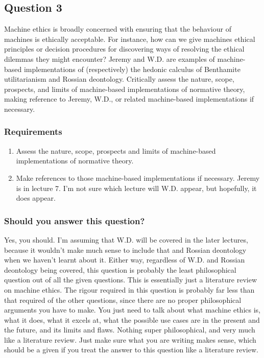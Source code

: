 \documentclass[11pt]{article}
\begin{document}
 \newpage
\subsection{Question 3}
\label{sec:org2453594}
Machine ethics is broadly concerned with ensuring that the behaviour of machines is ethically acceptable. For instance, how can we give machines ethical principles or decision procedures for discovering ways of resolving the ethical dilemmas they might encounter? Jeremy and W.D. are examples of machine-based implementations of (respectively) the hedonic calculus of Benthamite utilitarianism and Rossian deontology. Critically assess the nature, scope, prospects, and limits of machine-based implementations of normative theory, making reference to Jeremy, W.D., or related machine-based implementations if necessary.
\subsubsection{Requirements}
\label{sec:org148bb67}
\begin{enumerate}
\item Assess the nature, scope, prospects and limits of machine-based implementations of normative theory.
\item Make references to those machine-based implementations if necessary. Jeremy is in lecture 7. I'm not sure which lecture will W.D. appear, but hopefully, it does appear.
\end{enumerate}
\subsubsection{Should you answer this question?}
\label{sec:orgf74e2ed}
Yes, you should. I'm assuming that W.D. will be covered in the later lectures, because it wouldn't make much sense to include that and Rossian deontology when we haven't learnt about it. Either way, regardless of W.D. and Rossian deontology being covered, this question is probably the least philosophical question out of all the given questions. This is essentially just a literature review on machine ethics. The rigour required in this question is probably far less than that required of the other questions, since there are no proper philosophical arguments you have to make. You just need to talk about what machine ethics is, what it does, what it excels at, what the possible use cases are in the present and the future, and its limits and flaws. Nothing super philosophical, and very much like a literature review. Just make sure what you are writing makes sense, which should be a given if you treat the answer to this question like a literature review.
\end{document}
